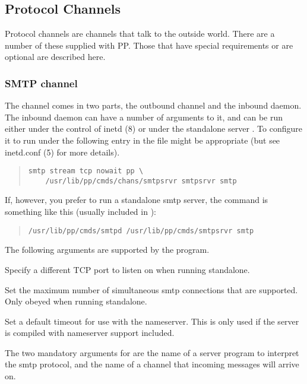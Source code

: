 \subsection	{Protocol Channels}

Protocol channels are channels that talk to the outside world. There
are a number of these supplied with PP.  Those that have special
requirements or are optional are described here.

\subsubsection	{SMTP channel}\label{sect:smtp}
The  channel comes in two parts, the outbound channel and the
inbound daemon. The inbound daemon can have a number of arguments to
it, and can be run either under the control of \man inetd (8) or under
the standalone server . To configure it to run under
 the following entry in the file 
might be appropriate (but see \man inetd.conf (5) for more details).

\begin{quote}\small\begin{verbatim}
smtp stream tcp nowait pp \
    /usr/lib/pp/cmds/chans/smtpsrvr smtpsrvr smtp
\end{verbatim}\end{quote}

If, however, you prefer to run a standalone smtp server, the command is
something like this (usually included in \file{pp.start}):

\begin{quote}\small\begin{verbatim}
/usr/lib/pp/cmds/smtpd /usr/lib/pp/cmds/smtpsrvr smtp
\end{verbatim}\end{quote}

The following arguments are supported by the  program.
\begin{describe}

\item[\verb|-p port|:]	Specify a different TCP port to listen on when
running standalone.

\item[\verb|-i maxcon|:] Set the maximum number of simultaneous smtp
connections that are supported. Only obeyed when running standalone.

\item[\verb|-t timeout|:]	Set a default timeout for use with the
nameserver. This is only used if the server is compiled with nameserver
support included.

\end{describe}
The two mandatory arguments for  are the name of a server
program to interpret the smtp protocol, and the name of a channel that
incoming messages will arrive on.

